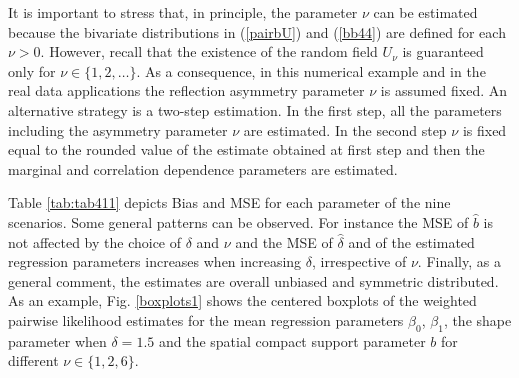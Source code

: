 \documentclass[times,sort&compress,3p]{elsarticle}
\theoremstyle{plain}%
\theoremstyle{definition}
\begin{document}
It is important to stress that,  in principle, the parameter $\nu$ can be estimated because
the bivariate distributions in  (\ref{pairbU}) and  (\ref{bb44}) are  defined for each $\nu>0$. However, recall that the existence of the random field
$U_{\nu}$ is guaranteed only for $\nu\in\{1,2,\ldots\}$. As a consequence, in this numerical example and in the real data applications
the reflection asymmetry parameter $\nu$ is assumed fixed. An alternative strategy is a two-step estimation. In the first step,  all the parameters including
the asymmetry parameter $\nu$ are estimated. In the second step
$\nu$ is fixed equal to the rounded value of the estimate obtained at first
step and then the  marginal and  correlation dependence parameters are estimated.




Table \ref{tab:tab411} depicts Bias and MSE for each parameter of the nine scenarios.
 Some general patterns can be observed. For instance the MSE of $\hat{b}$ is not affected by the choice of $\delta$ and $\nu$ and
 the MSE of $\hat{\delta}$  and of the  estimated regression parameters increases when increasing  $\delta$, irrespective of   $\nu$.
Finally, as a general comment, the
estimates are overall unbiased and symmetric distributed.
As an example, Fig.  \ref{boxplots1} shows the centered boxplots of the  weighted pairwise likelihood   estimates for the mean regression parameters $\beta_0$, $\beta_1$,  the shape parameter when $\delta=1.5$ and  the spatial compact support parameter $b$ for different  $\nu\in\{1,2,6\}$.
\end{document}
